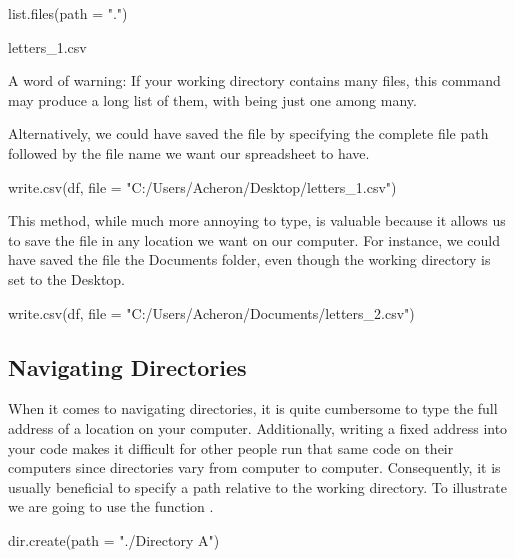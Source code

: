 \begin{inR}
list.files(path = ".")
\end{inR}

\begin{outR}
[1] letters_1.csv
\end{outR}

\noindent A word of warning: If your working directory contains many files, this command may produce a long list of them, with  being just one among many.

Alternatively, we could have saved the file by specifying the complete file path followed by the file name we want our spreadsheet to have.

\begin{inR}
write.csv(df, file = "C:/Users/Acheron/Desktop/letters_1.csv")
\end{inR}

\vspace{1em}

This method, while much more annoying to type, is valuable because it allows us to save the file in any location we want on our computer.  For instance, we could have saved the file the Documents folder, even though the working directory is set to the Desktop.

\begin{inR}
write.csv(df, file = "C:/Users/Acheron/Documents/letters_2.csv")
\end{inR}

\vspace{1em}

\subsection{Navigating Directories}

When it comes to navigating directories, it is quite cumbersome to type the full address of a location on your computer. Additionally, writing a fixed address into your code makes it difficult for other people run that same code on their computers since directories vary from computer to computer. Consequently, it is usually beneficial to specify a path relative to the working directory. To illustrate we are going to use the function .

\begin{inR}
dir.create(path = "./Directory A")
\end{inR}

\vspace{1em}

